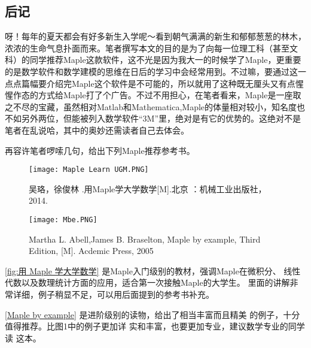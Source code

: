 \onecolumn
\setlength{\parindent}{2em}
\begin{large}
    \section*{后记}

    \begin{spacing}{1.5}
        \indent 呀！每年的夏天都会有好多新生入学呢～看到朝气满满的新生和郁郁葱葱的林木，浓浓的生命气息扑面而来。笔者撰写本文的目的是为了向每一位理工科（甚至文科）的同学推荐Maple这款软件，这不光是因为我大一的时候学了Maple，更重要的是数学软件和数学建模的思维在日后的学习中会经常用到。不过嘛，要通过这一点点篇幅要介绍完Maple这个软件是不可能的，所以就用了这种既无厘头又有点惺惺作态的方式给Maple打了个广告。不过不用担心，在笔者看来，Maple是一座取之不尽的宝藏，虽然相对Matlab和Mathematica,Maple的体量相对较小，知名度也不如另外两位，但能被列入数学软件“3M”里，绝对是有它的优势的。这绝对不是笔者在乱说哈，其中的奥妙还需读者自己去体会。

        再容许笔者啰嗦几句，给出下列Maple推荐参考书。\\

        \begin{figure}[htbp]
            \centering
            \begin{minipage}[t]
                {0.45\textwidth}
                \centering
                \texttt{[image: Maple Learn UGM.PNG]}
                \caption{吴珞，徐俊林
                .用Maple学大学数学[M].北京
                ：机械工业出版社，2014. }

                \label{fig:用 Maple 学大学数学}%
            \end{minipage}
            \quad
            \begin{minipage}[t]
                {0.45\textwidth}
                \centering
                \texttt{[image: Mbe.PNG]}
                \caption{Martha L. Abell,James B. Braselton, Maple by example, Third Edition, [M]. Acdemic Press, 2005}
                \label{Maple by example}%
            \end{minipage}
        \end{figure}
        \autoref{fig:用 Maple 学大学数学} 是Maple入门级别的教材，强调Maple在微积分、
        线性代数以及数理统计方面的应用，适合第一次接触Maple的大学生。
        里面的讲解非常详细，例子稍显不足，可以用后面提到的参考书补充。

        \autoref{Maple by example} \cite[Maple by example]{abell2005maple} 是进阶级别的读物，给出了相当丰富而且精美
        的例子，十分值得推荐。比图1中的例子更加详
        实和丰富，也要更加专业，建议数学专业的同学读
        这本。\\


\end{spacing}
\end{large}
